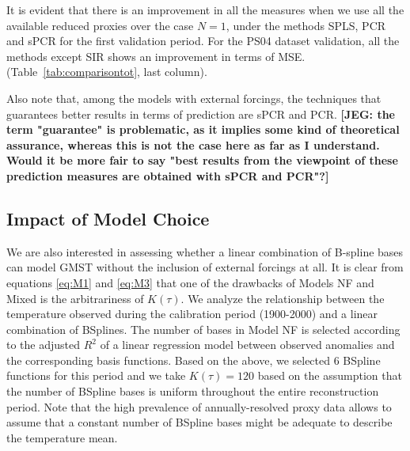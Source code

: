 \documentclass[12pt]{amsart}
\theoremstyle{plain}
\theoremstyle{definition}
\theoremstyle{remark}
\newcommand{\lb}[1]{\color{MidnightBlue}\textbf{[LB: #1]}\normalcolor}
\newcommand{\jeg}[1]{\color{ProcessBlue}\textbf{[JEG: #1]}\normalcolor}
\begin{document}
It is evident that there is an improvement in all the measures when we use all the available reduced proxies over the case
$N=1$, under the methods SPLS, PCR and sPCR for the first validation period.
For the PS04 dataset validation, all the methods except SIR shows an improvement in terms of MSE. (Table~\ref{tab:comparisontot}, last column). 

Also note that, among the models with external forcings, the techniques that
guarantees better results in terms of prediction are sPCR and PCR. \jeg{the term "guarantee" is problematic, as it implies some kind of theoretical assurance, whereas this is not the case here as far as I understand. Would it be more fair to say "best results from the viewpoint of these prediction measures are obtained with sPCR and PCR"?}

\subsection{Impact of Model Choice}
We are also interested in assessing whether a linear combination of B-spline bases can model GMST without the inclusion of external
forcings at all. It is clear from equations \eqref{eq:M1} and \eqref{eq:M3} that
one of the drawbacks of Models NF and Mixed is the arbitrariness of $K(\tau)$. We analyze the
relationship between the temperature observed during the calibration period
(1900-2000) and a linear combination of BSplines. The number of 
bases in Model NF is selected according to the adjusted $R^2$ of a linear regression model between observed anomalies and
the corresponding basis functions. Based on the above, we selected 6
BSpline functions for this period and we take $K(\tau)=120$ based on the
assumption that the number of BSpline bases is uniform
throughout the entire reconstruction period. Note that the high prevalence of
annually-resolved proxy data allows to assume that a constant number of BSpline bases might be adequate to describe the temperature
mean.%
  
\end{document}
